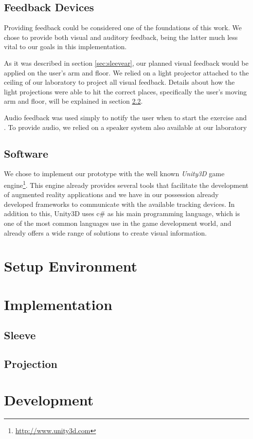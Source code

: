 \subsection{Feedback Devices}

Providing feedback could be considered one of the foundations of this work. 
We chose to provide both visual and auditory feedback, being the latter much less vital to our goals in this implementation.

As it was described in section \ref{sec:sleevear}, our planned visual feedback would be applied on the user's arm and floor.
We relied on a light projector attached to the ceiling of our laboratory to project all visual feedback.
Details about how the light projections were able to hit the correct places, specifically the user's moving arm and floor, will be explained in section \ref{prototype-projection}.

Audio feedback was used simply to notify the user when to start the exercise and .
To provide audio, we relied on a speaker system also available at our laboratory

\subsection{Software}

We chose to implement our prototype with the well known \emph{Unity3D} game engine\footnote{\url{http://www.unity3d.com}}.
This engine already provides several tools that facilitate the development of augmented reality applications and we have in our possession already developed frameworks to communicate with the available tracking devices. In addition to this, Unity3D uses c# as his main programming language, which is one of the most common languages use in the game development world, and already offers a wide range of solutions to create visual information.

\section{Setup Environment}

\section{Implementation}

\subsection{Sleeve}
\label{prototype-sleeve}

\subsection{Projection}
\label{prototype-projection}











\section{Development}
\label{sec:impl:dev}
